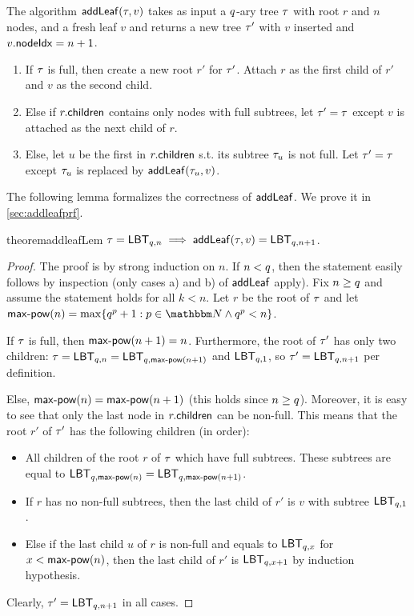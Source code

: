 \begin{definition}[$\addleaf$]\label{def:addleaf}
	The algorithm ${\mathsf{addLeaf}}(\tau, v)$ takes as input a $q$-ary tree $\tau$ with root $r$ and $n$ nodes, and a fresh leaf $v$ and returns a new tree $\tau'$ with $v$ inserted and $v.{\mathsf{nodeIdx}}=n+1$.
	\begin{enumerate}[label=\alph*),itemsep=0pt]
    \item If $\tau$ is full, then create a new root $r'$ for $\tau'$. Attach $r$ as the first child of $r'$ and $v$ as the second child.
    \item Else if $r.{\mathsf{children}}$ contains only nodes with full subtrees, let $\tau'=\tau$ except $v$ is attached as the next child of $r$.
    \item Else, let $u$ be the first in $r.{\mathsf{children}}$ s.t. its subtree $\tau_u$ is not full. Let $\tau'=\tau$ except $\tau_u$ is replaced by ${\mathsf{addLeaf}}(\tau_u,v)$.
	\end{enumerate}
\end{definition}

The following lemma formalizes the correctness of $\addleaf$. We prove it in \cref{sec:addleafprf}.
\begin{restatable}{theorem}{addleafLem}\label{lemm:addleaf}
	$\tau = {\mathsf{LBT}}_{q,n} \implies {\ensuremath{\mathsf{addLeaf}}}(\tau, v) = {\mathsf{LBT}}_{q,n+1}$.
\end{restatable}

\begin{proof}
  The proof is by strong induction on $n$. If $n<q$, then the statement easily follows by inspection (only cases a) and b) of $\addleaf$ apply).
  Fix $n\geq q$ and assume the statement holds for all $k<n$. Let $r$ be the root of $\tau$ and let $\mpow(n) = \max\{\treeArity^p + 1 : p \in \N \land \treeArity^p < n\}$.

  If $\tau$ is full, then ${\mathsf{max\textrm{-} pow}}(n+1)=n$. Furthermore, the root of $\tau'$ has only two children: $\tau={\mathsf{LBT}}_{q,n} = {\mathsf{LBT}}_{q,{\mathsf{max\textrm{-} pow}}(n+1)}$ and ${\mathsf{LBT}}_{q,1}$, so $\tau'={\mathsf{LBT}}_{q,n+1}$ per definition.

  Else, ${\mathsf{max\textrm{-} pow}}(n)={\mathsf{max\textrm{-} pow}}(n+1)$ (this holds since $n\geq q$). Moreover, it is easy to see that only the last node in $r.{\mathsf{children}}$ can be non-full. This means that the root $r'$ of $\tau'$ has the following children (in order):
  \begin{itemize}
    \item All children of the root $r$ of $\tau$ which have full subtrees. These subtrees are equal to ${\mathsf{LBT}}_{q,{\mathsf{max\textrm{-} pow}}(n)}={\mathsf{LBT}}_{q,{\mathsf{max\textrm{-} pow}}(n+1)}$.
    \item If $r$ has no non-full subtrees, then the last child of $r'$ is $v$ with subtree ${\mathsf{LBT}}_{q,1}$.
    \item Else if the last child $u$ of $r$ is non-full and equals to ${\mathsf{LBT}}_{q,x}$ for $x<{\mathsf{max\textrm{-} pow}}(n)$, then the last child of $r'$ is ${\mathsf{LBT}}_{q,x+1}$ by induction hypothesis.
  \end{itemize}
  Clearly, $\tau'={\mathsf{LBT}}_{q,n+1}$ in all cases.
\end{proof}